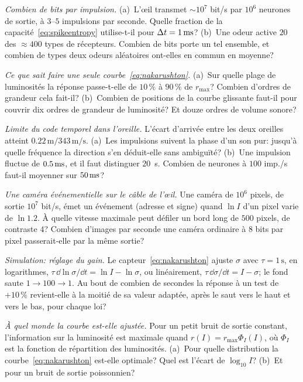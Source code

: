 \begin{exercise}[\lvlA]
\label{ex:11:2}
\emph{Combien de bits par impulsion.} (a)~L'œil transmet $\sim10^7$ bit/s par $10^6$ neurones de sortie, à $3$--$5$ impulsions par seconde. Quelle fraction de la capacité~\eqref{eq:spikeentropy} utilise-t-il pour $\Delta t=1\,\text{ms}$? (b)~Une odeur active $20$ des $\approx400$ types de récepteurs. Combien de bits porte un tel ensemble, et combien de types deux odeurs aléatoires ont-elles en commun en moyenne?
\end{exercise}

\begin{exercise}[\lvlB]
\label{ex:11:3}
\emph{Ce que sait faire une seule courbe~\eqref{eq:nakarushton}.} (a)~Sur quelle plage de luminosités la réponse passe-t-elle de $10\,\%$ à $90\,\%$ de $r_{\max}$? Combien d'ordres de grandeur cela fait-il? (b)~Combien de positions de la courbe glissante faut-il pour couvrir dix ordres de grandeur de luminosité? Et douze ordres de volume sonore?
\end{exercise}

\begin{exercise}[\lvlB]
\label{ex:11:4}
\emph{Limite du code temporel dans l'oreille.} L'écart d'arrivée entre les deux oreilles atteint $0.22\,\text{m}/343\,\text{m/s}$. (a)~Les impulsions suivent la phase d'un son pur: jusqu'à quelle fréquence la direction s'en déduit-elle sans ambiguïté? (b)~Une impulsion fluctue de $0.5\,\text{ms}$, et il faut distinguer $20$~\textmu s. Combien de neurones à $100$ imp./s faut-il moyenner sur $50\,\text{ms}$?
\end{exercise}

\begin{exercise}[\lvlB]
\label{ex:11:5}
\emph{Une caméra événementielle sur le câble de l'œil.} Une caméra de $10^6$ pixels, de sortie $10^7$ bit/s, émet un événement (adresse et signe) quand $\ln I$ d'un pixel varie de $\ln1.2$. À quelle vitesse maximale peut défiler un bord long de $500$ pixels, de contraste $4$? Combien d'images par seconde une caméra ordinaire à $8$ bits par pixel passerait-elle par la même sortie?
\end{exercise}

\begin{exercise}[\lvlB]
\label{ex:11:6}
\emph{Simulation: réglage du gain.} Le capteur~\eqref{eq:nakarushton} ajuste $\sigma$ avec $\tau=1\,\text{s}$, en logarithmes, $\tau\,\dd\ln\sigma/\dd t=\ln I-\ln\sigma$, ou linéairement, $\tau\,\dd\sigma/\dd t=I-\sigma$; le fond saute $1\to100\to1$. Au bout de combien de secondes la réponse à un test de $+10\,\%$ revient-elle à la moitié de sa valeur adaptée, après le saut vers le haut et vers le bas, pour chaque loi?
\end{exercise}

\begin{exercise}[\lvlC]
\label{ex:11:7}
\emph{À quel monde la courbe est-elle ajustée.} Pour un petit bruit de sortie constant, l'information sur la luminosité est maximale quand $r(I)=r_{\max}\Phi_I(I)$, où $\Phi_I$ est la fonction de répartition des luminosités. (a)~Pour quelle distribution la courbe~\eqref{eq:nakarushton} est-elle optimale? Quel est l'écart de $\log_{10}I$? (b)~Et pour un bruit de sortie poissonnien?
\end{exercise}
